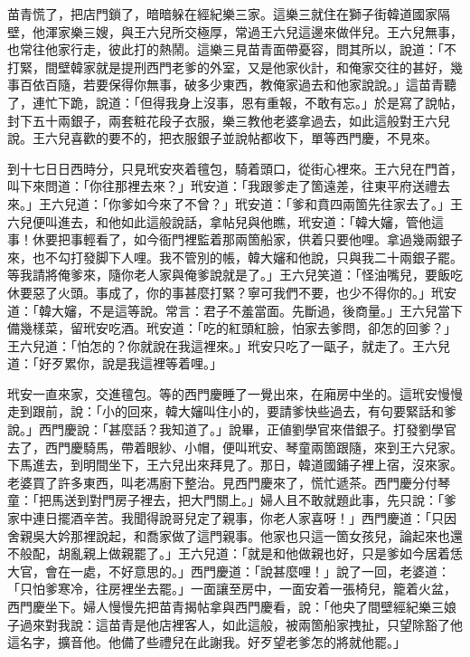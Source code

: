 苗青慌了，把店門鎖了，暗暗躲在經紀樂三家。這樂三就住在獅子街韓道國家隔壁，他渾家樂三嫂，與王六兒所交極厚，常過王六兒這邊來做伴兒。王六兒無事，也常往他家行走，彼此打的熱鬧。這樂三見苗青面帶憂容，問其所以，說道：「不打緊，間壁韓家就是提刑西門老爹的外室，又是他家伙計，和俺家交往的甚好，幾事百依百隨，若要保得你無事，破多少東西，教俺家過去和他家說說。」這苗青聽了，連忙下跪，說道：「但得我身上沒事，恩有重報，不敢有忘。」於是寫了說帖，封下五十兩銀子，兩套粧花段子衣服，樂三教他老婆拿過去，如此這般對王六兒說。王六兒喜歡的要不的，把衣服銀子並說帖都收下，單等西門慶，不見來。

到十七日日西時分，只見玳安夾着氊包，騎着頭口，從街心裡來。王六兒在門首，叫下來問道：「你往那裡去來？」玳安道：「我跟爹走了箇遠差，往東平府送禮去來。」王六兒道：「你爹如今來了不曾？」玳安道：「爹和賁四兩箇先往家去了。」王六兒便叫進去，和他如此這般說話，拿帖兒與他瞧，玳安道：「韓大嬸，管他這事！休要把事輕看了，如今衙門裡監着那兩箇船家，供着只要他哩。拿過幾兩銀子來，也不勾打發脚下人哩。我不管別的帳，韓大嬸和他說，只與我二十兩銀子罷。等我請將俺爹來，隨你老人家與俺爹說就是了。」王六兒笑道：「怪油嘴兒，要飯吃休要惡了火頭。事成了，你的事甚麼打緊？寧可我們不要，也少不得你的。」玳安道：「韓大嬸，不是這等說。常言：君子不羞當面。先斷過，後商量。」王六兒當下備幾樣菜，留玳安吃酒。玳安道：「吃的紅頭紅臉，怕家去爹問，卻怎的回爹？」王六兒道：「怕怎的？你就說在我這裡來。」玳安只吃了一甌子，就走了。王六兒道：「好歹累你，說是我這裡等着哩。」

玳安一直來家，交進氊包。等的西門慶睡了一覺出來，在廂房中坐的。這玳安慢慢走到跟前，說：「小的回來，韓大嬸叫住小的，要請爹快些過去，有句要緊話和爹說。」西門慶說：「甚麼話？我知道了。」說畢，正値劉學官來借銀子。{}打發劉學官去了，西門慶騎馬，帶着眼紗、小帽，便叫玳安、琴童兩箇跟隨，來到王六兒家。下馬進去，到明間坐下，王六兒出來拜見了。那日，韓道國鋪子裡上宿，沒來家。老婆買了許多東西，叫老馮廚下整治。見西門慶來了，慌忙遞茶。西門慶分付琴童：「把馬送到對門房子裡去，把大門關上。」婦人且不敢就題此事，先只說：「爹家中連日擺酒辛苦。我聞得說哥兒定了親事，你老人家喜呀！」西門慶道：「只因舍親吳大妗那裡說起，和喬家做了這門親事。他家也只這一箇女孩兒，論起來也還不般配，胡亂親上做親罷了。」王六兒道：「就是和他做親也好，只是爹如今居着恁大官，會在一處，不好意思的。」西門慶道：「說甚麼哩！」說了一回，老婆道：「只怕爹寒冷，往房裡坐去罷。」一面讓至房中，一面安着一張椅兒，籠着火盆，西門慶坐下。婦人慢慢先把苗青揭帖拿與西門慶看，說：「他央了間壁經紀樂三娘子過來對我說：這苗青是他店裡客人，如此這般，被兩箇船家拽扯，只望除豁了他這名字，擴音他。他備了些禮兒在此謝我。好歹望老爹怎的將就他罷。」

